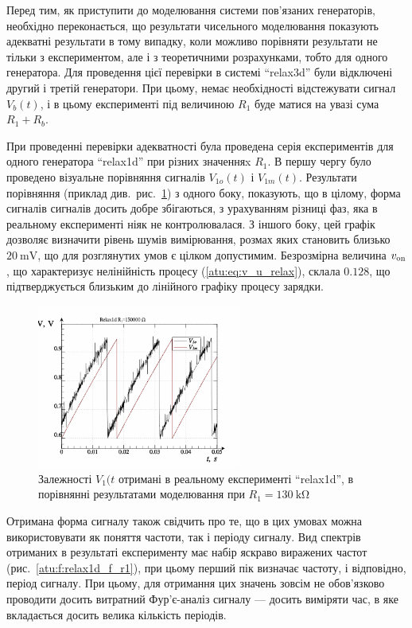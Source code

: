 Перед тим, як приступити до моделювання системи пов'язаних
генераторів, необхідно переконається, що результати
чисельного моделювання показують адекватні результати в
тому випадку, коли можливо порівняти результати не тільки з
експериментом, але і з теоретичними розрахунками, тобто для
одного генератора. Для проведення цієї перевірки в системі
``relax3d'' були відключені другий і третій генератори. При цьому,
немає необхідності відстежувати сигнал
$ V_b (t) $, і в цьому експерименті під величиною
$ R_1 $ буде матися на увазі сума
$ R_1 + R_b $.

При проведенні перевірки адекватності була проведена серія
експериментів для одного генератора ``relax1d'' при різних значенняx
$R_1$. В першу чергу було проведено візуальне порівняння сигналів
$V_{1o}(t) $ і
$V_{1m}(t) $. Результати порівняння (приклад
див.~рис.~\ref{atu:f:relax1d_read_cmp-p_t_r1}) з одного боку, показують, що в
цілому, форма сигналів сигналів досить добре збігаються, з
урахуванням різниці фаз, яка в реальному експерименті ніяк не
контролювалася. З іншого боку, цей графік дозволяє визначити
рівень шумів вимірювання, розмах яких становить близько
$ \SI{20}{\milli \volt} $, що для розглянутих умов є цілком
допустимим. Безрозмірна величина
$ v _\mathrm{on} $, що характеризує нелінійність процесу (\ref{atu:eq:v_u_relax}),
склала
$ 0.128 $, що підтверджується близьким до лінійного графіку процесу
зарядки.



\begin{figure}[htb!]
  \centerline{\includegraphics[width=0.6\textwidth]{p/relax1d_read_cmp-p_t_r1=130k.png} }
\caption{Залежності $V_1(t $ отримані в реальному експерименті ``relax1d'', в порівнянні результатами моделювання при $ R_1 = \SI{130}{\kilo \ohm} $}
\label{atu:f:relax1d_read_cmp-p_t_r1}
\end{figure}

Отримана форма сигналу також свідчить про те, що в цих умовах
можна використовувати як поняття частоти, так і періоду
сигналу. Вид спектрів отриманих в результаті експерименту має
набір яскраво виражених частот (рис.~\ref{atu:f:relax1d_f_r1}), при
цьому перший пік визначає частоту, і відповідно, період
сигналу. При цьому, для отримання цих значень зовсім не
обов'язково проводити досить витратний Фур'є-аналіз сигналу ---
досить виміряти час, в яке вкладається досить велика кількість
періодів.

